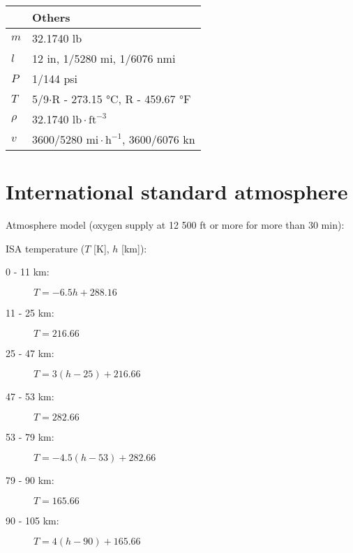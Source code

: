 \documentclass[10pt, twocolumn]{article}
\begin{document}
\begin{table}[ht]
\begin{center}
\begin{tabular}{ %
        l|l|l
      }
    \end{tabular}
    \begin{tabular}{l|l}
               & Others                                                        \\ \hline\hline
      \(m\)    & 32.1740 lb                                                    \\ \hline
      \(l\)    & 12 in, 1/5280 mi, 1/6076 nmi                                  \\ \hline
      \(P\)    & 1/144 psi                                                     \\ \hline
      \(T\)    & 5/9\(\cdot\)R - 273.15 °C, R - 459.67 °F                      \\ \hline
      \(\rho\) & 32.1740 \(\mathrm{lb} \cdot \mathrm{ft}^{-3}\)                \\ \hline
      \(v\)    & 3600/5280 \(\mathrm{mi} \cdot \mathrm{h}^{-1}\), 3600/6076 kn \\
    \end{tabular}
  \end{center}
\end{table}


\section{International standard atmosphere}
Atmosphere model (oxygen supply at 12 500 ft or more for more than 30 min):


ISA temperature (\(T\) [K], \(h\) [km]):
\begin{description}
  \item[0 - 11 km:] \(T = -6.5 h + 288.16\)
  \item[11 - 25 km:] \(T = 216.66\)
  \item[25 - 47 km:] \(T = 3 (h - 25) + 216.66\)
  \item[47 - 53 km:] \(T = 282.66\)
  \item[53 - 79 km:] \(T = -4.5 (h - 53) + 282.66\)
  \item[79 - 90 km:] \(T = 165.66\)
  \item[90 - 105 km:] \(T = 4 (h - 90) + 165.66\)
\end{description}
\end{document}
